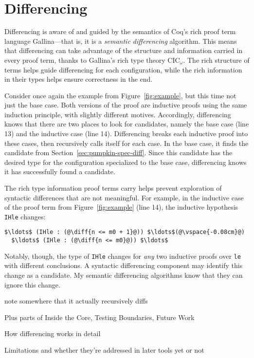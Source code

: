 \section{Differencing}
\label{sec:pumpkin-diff}


Differencing is aware of and guided by the semantics of Coq's rich proof term language Gallina---that is, it is a \textit{semantic differencing} algorithm.
This means that differencing can take advantage of the structure and information carried in every proof term,
thanks to Gallina's rich type theory CIC$_{\omega}$.
The rich structure of terms helps guide differencing for each configuration,
while the rich information in their types helps ensure correctness in the end.

Consider once again the example from Figure~\ref{fig:example}, but this time not just the base case.
Both versions of the proof are inductive proofs using the same induction principle, with slightly different motives.
Accordingly, differencing knows that there are two places to look for candidates, namely the base case (line 13)
and the inductive case (line 14).
Differencing breaks each inductive proof into these cases, then recursively calls itself for each case.
In the base case, it finds the candidate from Section~\ref{sec:pumpkin-spec-diff}.
Since this candidate has the desired type for the configuration specialized to the base case, differencing knows it has successfully found a candidate.

The rich type information proof terms carry helps prevent exploration of syntactic differences that are not meaningful.
For example, in the inductive case of the proof term from Figure~\ref{fig:example} (line 14), the inductive hypothesis \lstinline{IHle} changes:

\begin{lstlisting}[language=coq]
  $\ldots$ (IHle : (@\diff{n <= m0 + 1}@)) $\ldots$(@\vspace{-0.08cm}@)
  $\ldots$ (IHle : (@\diff{n <= m0}@)) $\ldots$
\end{lstlisting}
Notably, though, the type of \lstinline{IHle} changes for \emph{any} two inductive proofs over \lstinline{le}
with different conclusions. A syntactic differencing component 
may identify this change as a candidate.
My semantic differencing algorithms know that they can ignore this change.

note somewhere that it actually recursively diffs

Plus parts of Inside the Core, Testing Boundaries, Future Work

How differencing works in detail

Limitations and whether they're addressed in later tools yet or not

